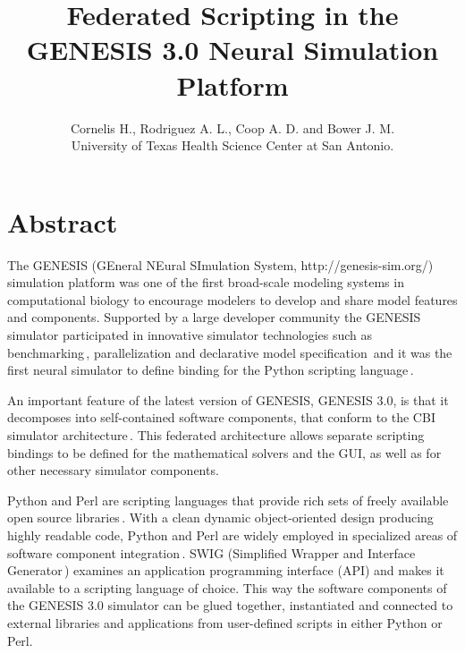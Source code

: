 \documentclass[12pt]{article}
\begin{document}
\title{\bf Federated Scripting in the GENESIS 3.0 Neural Simulation
  Platform}

\author{Cornelis H., Rodriguez A. L., Coop A. D. and Bower J. M. \\
  {\small University of Texas Health Science Center at San Antonio.}
}

\maketitle
{}
\newpage
\section*{Abstract}
The GENESIS (GEneral NEural SImulation System,
http://genesis-sim.org/) simulation platform was one of the first
broad-scale modeling systems in computational biology to encourage
modelers to develop and share model features and components.
Supported by a large developer community the GENESIS simulator
participated in innovative simulator technologies such as
benchmarking\,\cite{bhalla92:_rallp},
parallelization\cite{goddard98:_book_genes} and declarative model
specification\,\cite{nigel01:_towar_neurom} and it was the first
neural simulator to define binding for the Python scripting
language\,\cite{vanier97:_genes_python}.

An important feature of the latest version of GENESIS, GENESIS 3.0, is
that it decomposes into self-contained software components, that
conform to the CBI simulator
architecture\,\cite{cornelis08:_cbi_archit_comput_simul_realis}.  This
federated architecture allows separate scripting bindings to be
defined for the mathematical solvers and the GUI, as well as for other
necessary simulator components.

Python and Perl are scripting languages that provide rich sets of
freely available open source
libraries\,\cite{langtangen04:_python_scrip_comput_scien,valiente09:_combin_patter_match_algor_comput}.
With a clean dynamic object-oriented design producing highly readable
code, Python and Perl are widely employed in specialized areas of
software component
integration\,\cite{thiruvathukal01:_web_progr_python,
  lee07:_open_sourc_devel_lamp}.
SWIG (Simplified Wrapper and Interface
Generator\,\cite{08:_simpl_wrapp_inter_gener}) examines an application
programming interface (API) and makes it available to a scripting
language of choice.  This way the software components of the GENESIS
3.0 simulator can be glued together, instantiated and connected to
external libraries and applications from user-defined scripts in
either Python or Perl.
\end{document}
